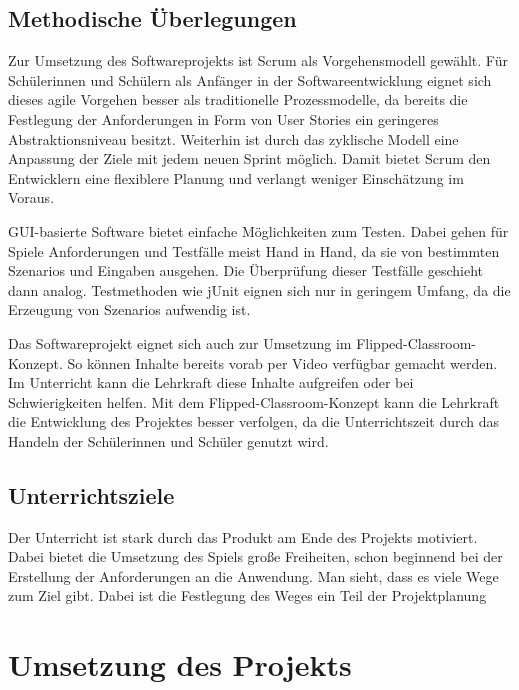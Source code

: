 \documentclass[a4paper,12pt]{article}
\newcommand{\sus}{Schülerinnen und Schüler}
\newcommand{\susn}{\sus n}
\begin{document}
\subsection{Methodische Überlegungen}

    Zur Umsetzung des Softwareprojekts ist Scrum als Vorgehensmodell gewählt.
    Für \susn{} als Anfänger in der Softwareentwicklung eignet sich dieses agile Vorgehen besser als 
    traditionelle Prozessmodelle, da bereits die Festlegung der Anforderungen in Form
    von User Stories ein geringeres Abstraktionsniveau besitzt.
    Weiterhin ist durch das zyklische Modell eine Anpassung der Ziele mit jedem neuen Sprint möglich.
    Damit bietet Scrum den Entwicklern eine flexiblere Planung und verlangt weniger Einschätzung im Voraus.

    GUI-basierte Software bietet einfache Möglichkeiten zum Testen.
    Dabei gehen für Spiele Anforderungen und Testfälle meist Hand in Hand, 
    da sie von bestimmten Szenarios und Eingaben ausgehen.
    Die Überprüfung dieser Testfälle geschieht dann analog. 
    Testmethoden wie jUnit eignen sich nur in geringem Umfang, 
    da die Erzeugung von Szenarios aufwendig ist.

    Das Softwareprojekt eignet sich auch zur Umsetzung im Flipped-Classroom-Konzept.
    So können Inhalte bereits vorab per Video verfügbar gemacht werden.
    Im Unterricht kann die Lehrkraft diese Inhalte aufgreifen oder bei Schwierigkeiten helfen.
    Mit dem Flipped-Classroom-Konzept kann die Lehrkraft die Entwicklung des Projektes besser verfolgen,
    da die Unterrichtszeit durch das Handeln der \sus{} genutzt wird.


\subsection{Unterrichtsziele}

    Der Unterricht ist stark durch das Produkt am Ende des Projekts motiviert. 
    Dabei bietet die Umsetzung des Spiels große Freiheiten, 
    schon beginnend bei der Erstellung der Anforderungen an die Anwendung.
    Man sieht, dass es viele Wege zum Ziel gibt.
    Dabei ist die Festlegung des Weges ein Teil der Projektplanung


\section{Umsetzung des Projekts}
\end{document}
